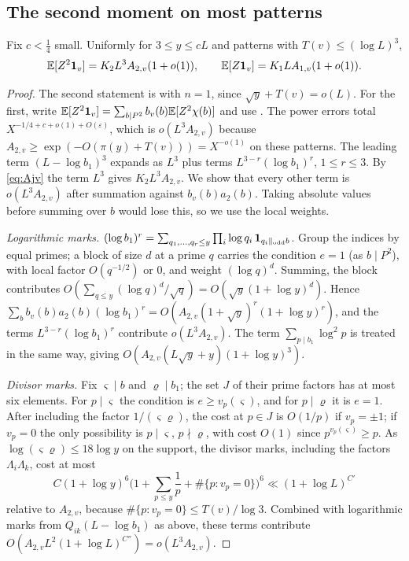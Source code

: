 \documentclass[11pt,colorlinks]{charlie}
\begin{document}
\subsection{The second moment on most patterns}
\begin{lemma}\label{lem:second-pattern}
Fix $c<\frac14$ small. Uniformly for $3\le y\le cL$ and patterns with $T(v)\le(\log L)^3$,
\[
 \mathbb{E}[Z^2\mathbf{1}_v]=K_2L^3A_{2,v}(1+o(1)),\qquad\mathbb{E}[Z\mathbf{1}_v]=K_1LA_{1,v}(1+o(1)).
\]
\end{lemma}
\begin{proof}
The second statement is  with $n=1$, since $\sqrt y+T(v)=o(L)$. For the first, write $\mathbb{E}[Z^2\mathbf{1}_v]=\sum_{b\mid P^2}b_v(b)\mathbb{E}[Z^2\chi(b)]$ and use . The power errors total $X^{-1/4+c+o(1)+O(\varepsilon)}$, which is $o(L^3A_{2,v})$ because $A_{2,v}\ge\exp(-O(\pi(y)+T(v)))=X^{-o(1)}$ on these patterns. The leading term $(L-\log b_1)^3$ expands as $L^3$ plus terms $L^{3-r}(\log b_1)^r$, $1\le r\le3$. By \eqref{eq:Ajv} the term $L^3$ gives $K_2L^3A_{2,v}$. We show that every other term is $o(L^3A_{2,v})$ after summation against $b_v(b)a_2(b)$. Taking absolute values before summing over $b$ would lose this, so we use the local weights.

\emph{Logarithmic marks.} $(\log b_1)^r=\sum_{q_1,\dots,q_r\le y}\prod_i\log q_i\,\mathbf{1}_{q_i\parallel_{\rm odd}b}$. Group the indices by equal primes; a block of size $d$ at a prime $q$ carries the condition $e=1$ (as $b\mid P^2$), with local factor $O(q^{-1/2})$ or $0$, and weight $(\log q)^d$. Summing, the block contributes $O(\sum_{q\le y}(\log q)^d/\sqrt q)=O(\sqrt y(1+\log y)^d)$. Hence $\sum_bb_v(b)a_2(b)(\log b_1)^r=O(A_{2,v}(1+\sqrt y)^r(1+\log y)^r)$, and the terms $L^{3-r}(\log b_1)^r$ contribute $o(L^3A_{2,v})$. The term $\sum_{p\mid b_1}\log^2p$ is treated in the same way, giving $O(A_{2,v}(L\sqrt y+y)(1+\log y)^3)$.

\emph{Divisor marks.} Fix $\varsigma\mid b$ and $\varrho\mid b_1$; the set $J$ of their prime factors has at most six elements. For $p\mid\varsigma$ the condition is $e\ge v_p(\varsigma)$, and for $p\mid\varrho$ it is $e=1$. After including the factor $1/(\varsigma\varrho)$, the cost at $p\in J$ is $O(1/p)$ if $v_p=\pm1$; if $v_p=0$ the only possibility is $p\mid\varsigma$, $p\nmid\varrho$, with cost $O(1)$ since $p^{v_p(\varsigma)}\ge p$. As $\log(\varsigma\varrho)\le18\log y$ on the support, the divisor marks, including the factors $\Lambda_i\Lambda_k$, cost at most
\[
 C(1+\log y)^6\Big(1+\sum_{p\le y}\frac1p+\#\{p:v_p=0\}\Big)^6\ll(1+\log L)^{C'}
\]
relative to $A_{2,v}$, because $\#\{p:v_p=0\}\le T(v)/\log3$. Combined with logarithmic marks from $Q_{ik}(L-\log b_1)$ as above, these terms contribute $O(A_{2,v}L^2(1+\log L)^{C''})=o(L^3A_{2,v})$.
\end{proof}
\end{document}
